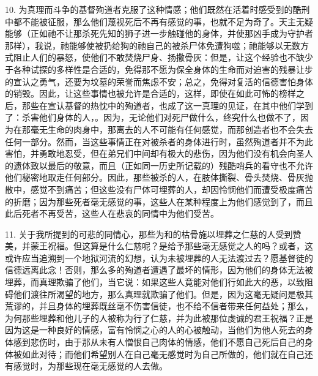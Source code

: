 10. 为真理而斗争的基督殉道者克服了这种情感；他们既然在活着时感受到的酷刑中都不能被征服，那么他们蔑视死后不再有感觉的事，也就不足为奇了。天主无疑能够（正如祂不让那杀死先知的狮子进一步触碰他的身体，并使那凶手成为守护者那样），我说，祂能够使被扔给狗的祂自己的被杀尸体免遭狗噬；祂能够以无数方式阻止人们的暴怒，使他们不敢焚烧尸身、扬撒骨灰：但是，让这个经验也不缺少于各种试探的多样性是合适的，免得那不愿为保全身体的生命而对迫害的残暴让步的宣认之勇气，还要为坟墓的荣誉而焦虑不安；总之，免得对复活的信德害怕身体的销毁。因此，让这些事情也被允许是合适的，这样，即使在如此可怖的榜样之后，那些在宣认基督的热忱中的殉道者，也成了这一真理的见证，在其中他们学到了：杀害他们身体的人，。因为，无论他们对死尸做什么，终究什么也做不了，因为在那毫无生命的肉身中，那离去的人不可能有任何感觉，而那创造者也不会失去任何一部分。然而，当这些事情正在对被杀者的身体进行时，虽然殉道者并不为此害怕，并勇敢地忍受，但在弟兄们中间却有极大的悲伤，因为他们没有机会向圣人的遗体致以最后的敬意，而且（正如同一历史所记载的）残酷哨兵的看守也不允许他们秘密地取走任何部分。因此，那些被杀的人，在肢体撕裂、骨头焚烧、骨灰抛散中，感觉不到痛苦；但这些没有尸体可埋葬的人，却因怜悯他们而遭受极度痛苦的折磨；因为那些死者毫无感觉的事，这些人在某种程度上为他们感觉到了，而且此后死者不再受苦，这些人在悲哀的同情中为他们受苦。\par

11. 关于我所提到的可悲的同情心，那些为和的枯骨施以埋葬之仁慈的人受到赞美，并蒙王祝福。但这算是什么仁慈呢？是给予那些毫无感觉之人的吗？或者，这或许应当追溯到一个地狱河流的幻想，认为未被埋葬的人无法渡过去？愿基督徒的信德远离此念！否则，那么多的殉道者遭遇了最坏的情形，因为他们的身体无法被埋葬，而真理欺骗了他们，当它说：如果这些人竟能对他们行如此大的恶，以致阻碍他们渡往所渴望的地方，那么真理就欺骗了他们。但是，因为这毫无疑问是极其荒谬的，并且身体的埋葬既丝毫不伤害信徒，也不给不信者带来任何益处；那么，为何那些埋葬和他儿子的人被称为行了仁慈，并为此被那位虔诚的君王祝福？正是因为这是一种良好的情感，富有怜悯之心的人的心被触动，当他们为他人死去的身体感到悲伤时，由于那从未有人憎恨自己肉体的情感，他们不愿自己死后自己的身体被如此对待；而他们希望别人在自己毫无感觉时为自己所做的，他们就在自己还有感觉时，为那些现在毫无感觉的人去做。\par


